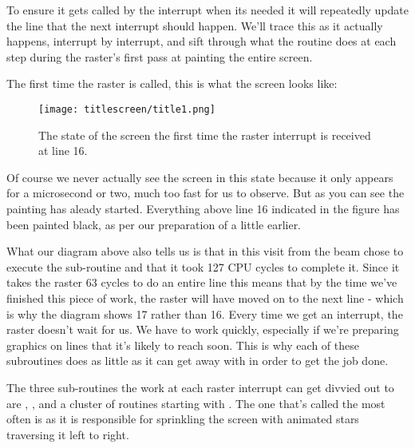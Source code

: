 To ensure it gets called by the interrupt when its needed it will repeatedly update the line that the next interrupt
should happen. We'll trace this as it actually happens, interrupt by interrupt, and sift through what the routine
does at each step during the raster's first pass at painting the entire screen.

The first time the raster is called, this is what the screen looks like:

\begin{figure}[H]
    \centering
      \texttt{[image: titlescreen/title1.png]}%
\caption{The state of the screen the first time the raster interrupt is received at line 16.}
\end{figure}

Of course we never actually see the screen in this state because it only appears for a microsecond or two, much too
fast for us to observe. But as you can see the painting has aleady started. Everything above line 16 indicated in 
the figure has been painted black, as per our preparation of  a little earlier.

What our diagram above also tells us is that in this visit from the beam  chose to execute
the sub-routine  and that it took 127 CPU cycles to complete it. Since it takes the
raster 63 cycles to do an entire line this means that by the time we've finished this piece of work, the raster will have
moved on to the next line - which is why the diagram shows 17 rather than 16. Every time we get an interrupt, the 
raster doesn't wait for us. We have to work quickly, especially if we're preparing graphics on lines that it's likely
to reach soon. This is why each of these subroutines does as little as it can get away with in order to get the job done.

The three sub-routines the work at each raster interrupt can get divvied out to are ,
, and a cluster of routines starting with . The one
that's called the most often is  as it is responsible for sprinkling the screen with 
animated stars traversing it left to right.

